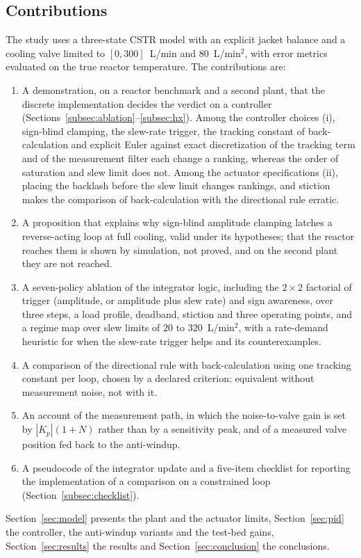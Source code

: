 \subsection{Contributions}
The study uses a three-state CSTR model with an explicit jacket balance and a cooling valve limited to $[0, 300]$~L/min and $80$~L/min$^2$, with error metrics evaluated on the true reactor temperature. The contributions are:
\begin{enumerate}
    \item A demonstration, on a reactor benchmark and a second plant, that the discrete implementation decides the verdict on a controller (Sections~\ref{subsec:ablation}--\ref{subsec:hx}). Among the controller choices (i), sign-blind clamping, the slew-rate trigger, the tracking constant of back-calculation and explicit Euler against exact discretization of the tracking term and of the measurement filter each change a ranking, whereas the order of saturation and slew limit does not. Among the actuator specifications (ii), placing the backlash before the slew limit changes rankings, and stiction makes the comparison of back-calculation with the directional rule erratic.
    \item A proposition that explains why sign-blind amplitude clamping latches a reverse-acting loop at full cooling, valid under its hypotheses; that the reactor reaches them is shown by simulation, not proved, and on the second plant they are not reached.
    \item A seven-policy ablation of the integrator logic, including the $2\times 2$ factorial of trigger (amplitude, or amplitude plus slew rate) and sign awareness, over three steps, a load profile, deadband, stiction and three operating points, and a regime map over slew limits of $20$ to $320$~L/min$^2$, with a rate-demand heuristic for when the slew-rate trigger helps and its counterexamples.
    \item A comparison of the directional rule with back-calculation using one tracking constant per loop, chosen by a declared criterion: equivalent without measurement noise, not with it.
    \item An account of the measurement path, in which the noise-to-valve gain is set by $|K_p|(1+N)$ rather than by a sensitivity peak, and of a measured valve position fed back to the anti-windup.
    \item A pseudocode of the integrator update and a five-item checklist for reporting the implementation of a comparison on a constrained loop (Section~\ref{subsec:checklist}).
\end{enumerate}
Section~\ref{sec:model} presents the plant and the actuator limits, Section~\ref{sec:pid} the controller, the anti-windup variants and the test-bed gains, Section~\ref{sec:results} the results and Section~\ref{sec:conclusion} the conclusions.
